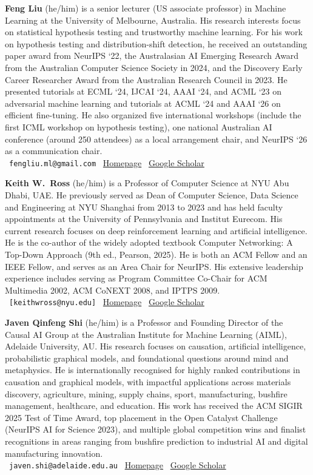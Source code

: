 \documentclass{article}
\newcommand{\orginfo}[3]{\\{\small\faEnvelope\ \texttt{#1} \hfill \faHome\ \href{https://#2}{Homepage} \hfill \faGraduationCap\ \href{https://scholar.google.com/citations?user=#3}{Google Scholar}}}
\begin{document}
\textbf{Feng Liu} (he/him) is a senior lecturer (US associate professor) in Machine Learning at the University of Melbourne, Australia. His research interests focus on statistical hypothesis testing and trustworthy machine learning. For his work on hypothesis testing and distribution-shift detection, he received an outstanding paper award from NeurIPS ‘22, the Australasian AI Emerging Research Award from the Australian Computer Science Society in 2024, and the Discovery Early Career Researcher Award from the Australian Research Council in 2023. He presented tutorials at ECML ‘24, IJCAI ‘24, AAAI ‘24, and ACML ‘23 on adversarial machine learning and tutorials at ACML ‘24 and AAAI ‘26 on efficient fine-tuning. He also organized five international workshops (include the first ICML workshop on hypothesis testing), one national Australian AI conference (around 250 attendees) as a local arrangement chair, and NeurIPS ‘26 as a communication chair.
\orginfo{fengliu.ml@gmail.com}{fengliu90.github.io}{[scholar\_id]}

\textbf{Keith W.\ Ross} (he/him) is a Professor of Computer Science at NYU Abu Dhabi, UAE. He previously served as Dean of Computer Science, Data Science and Engineering at NYU Shanghai from 2013 to 2023 and has held faculty appointments at the University of Pennsylvania and Institut Eurecom. His current research focuses on deep reinforcement learning and artificial intelligence. He is the co-author of the widely adopted textbook Computer Networking: A Top-Down Approach (9th ed., Pearson, 2025). He is both an ACM Fellow and an IEEE Fellow, and serves as an Area Chair for NeurIPS. His extensive leadership experience includes serving as Program Committee Co-Chair for ACM Multimedia 2002, ACM CoNEXT 2008, and IPTPS 2009.
\orginfo{[keithwross@nyu.edu]}{https://sites.google.com/nyu.edu/keithross/}{RhUcYmQAAAAJ}

\textbf{Javen Qinfeng Shi} (he/him) is a Professor and Founding Director of the Causal AI Group at the Australian Institute for Machine Learning (AIML), Adelaide University, AU. His research focuses on causation, artificial intelligence, probabilistic graphical models, and foundational questions around mind and metaphysics. He is internationally recognised for highly ranked contributions in causation and graphical models, with impactful applications across materials discovery, agriculture, mining, supply chains, sport, manufacturing, bushfire management, healthcare, and education. His work has received the ACM SIGIR 2025 Test of Time Award, top placement in the Open Catalyst Challenge (NeurIPS AI for Science 2023), and multiple global competition wins and finalist recognitions in areas ranging from bushfire prediction to industrial AI and digital manufacturing innovation. 
\orginfo{javen.shi@adelaide.edu.au}{https://javenshi.org/}{h6O9vYkAAAAJ}
\end{document}
